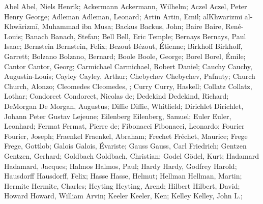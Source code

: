 \DefFriend Abel             Abel, Niels Henrik;
\DefFriend Ackermann        Ackermann, Wilhelm;
\DefFriend Aczel            Aczel, Peter Henry George;
\DefFriend Adleman          Adleman, Leonard;
\DefFriend Artin            Artin, Emil;
\DefFriend alKhwarizmi      al-Khwārizmī, Muhammad ibn Musa;
\DefFriend Backus           Backus, John;
\DefFriend Baire            Baire, René-Louis;
\DefFriend Banach           Banach, Stefan;
\DefFriend Bell             Bell, Eric Temple;
\DefFriend Bernays          Bernays, Paul Isaac;
\DefFriend Bernstein        Bernstein, Felix;
\DefFriend Bezout           Bézout, Étienne;
\DefFriend Birkhoff         Birkhoff, Garrett;
\DefFriend Bolzano          Bolzano, Bernard;
\DefFriend Boole            Boole, George;
\DefFriend Borel            Borel, Émile;
\DefFriend Cantor           Cantor, Georg;
\DefFriend Carmichael       Carmichael, Robert Daniel;
\DefFriend Cauchy           Cauchy, Augustin-Louis;
\DefFriend Cayley           Cayley, Arthur;
\DefFriend Chebychev        Chebychev, Pafnuty;
\DefFriend Church           Church, Alonzo;
\DefFriend Cleomedes        Cleomedes, ; %
\DefFriend Curry            Curry, Haskell;
\DefFriend Collatz          Collatz, Lothar;
\DefFriend Condorcet        Condorcet, Nicolas de;
\DefFriend Dedekind         Dedekind, Richard;
\DefFriend DeMorgan         De Morgan, Augustus;
\DefFriend Diffie           Diffie, Whitfield;
\DefFriend Dirichlet        Dirichlet, Johann Peter Gustav Lejeune;
\DefFriend Eilenberg        Eilenberg, Samuel;
\DefFriend Euler            Euler, Leonhard;
\DefFriend Fermat           Fermat, Pierre de;
\DefFriend Fibonacci        Fibonacci, Leonardo;
\DefFriend Fourier          Fourier, Joseph;
\DefFriend Fraenkel         Fraenkel, Abraham;
\DefFriend Frechet          Fréchet, Maurice;
\DefFriend Frege            Frege, Gottlob;
\DefFriend Galois           Galois, Évariste;
\DefFriend Gauss            Gauss, Carl Friedrich;
\DefFriend Gentzen          Gentzen, Gerhard;
\DefFriend Goldbach         Goldbach, Christian;
\DefFriend Godel            Gödel, Kurt;
\DefFriend Hadamard         Hadamard, Jacques;
\DefFriend Halmos           Halmos, Paul;
\DefFriend Hardy            Hardy, Godfrey Harold;
\DefFriend Hausdorff        Hausdorff, Felix;
\DefFriend Hasse            Hasse, Helmut;
\DefFriend Hellman          Hellman, Martin;
\DefFriend Hermite          Hermite, Charles;
\DefFriend Heyting          Heyting, Arend;
\DefFriend Hilbert          Hilbert, David;
\DefFriend Howard           Howard, William Arvin;
\DefFriend Keeler           Keeler, Ken;
\DefFriend Kelley           Kelley, John L.;
